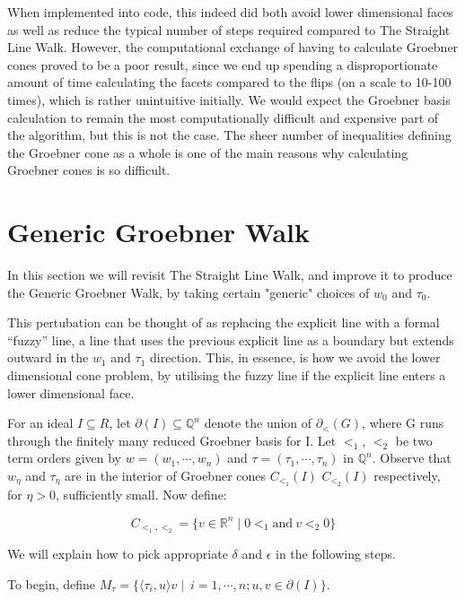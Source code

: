 \documentclass[12pt,a4paper]{report}
\begin{document}
When implemented into code, this indeed did both avoid lower dimensional faces as well as reduce the typical number of steps required compared to The Straight Line Walk. However, the computational exchange of having to calculate Groebner cones proved to be a poor result, since we end up spending a disproportionate amount of time calculating the facets compared to the flips (on a scale to 10-100 times), which is rather unintuitive initially. We would expect the Groebner basis calculation to remain the most computationally difficult and expensive part of the algorithm, but this is not the case. The sheer number of inequalities defining the Groebner cone as a whole is one of the main reasons why calculating Groebner cones is so difficult.

\section{Generic Groebner Walk}
In this section we will revisit The Straight Line Walk, and improve it to produce the Generic Groebner Walk, by taking certain "generic" choices of $w_{0}$ and $\tau_{0}$.


This pertubation can be thought of as replacing the explicit line with a formal ``fuzzy'' line, a line that uses the previous explicit line as a boundary but extends outward in the $w_{1}$ and $\tau_{1}$ direction. This, in essence, is how we avoid the lower dimensional cone problem, by utilising the fuzzy line if the explicit line enters a lower dimensional face.

For an ideal $I \subseteq R$, let $\partial (I) \subseteq \mathbb Q^n$ denote the union of $\partial_{<} (G)$, where G runs through the finitely many reduced Groebner basis for I. Let $<_{1}$, $<_{2}$ be two term orders given by $w = (w_{1}, \cdots, w_{n})$ and $\tau = (\tau_{1}, \cdots, \tau_{n})$ in $\mathbb Q^n$. Observe that $w_{\eta}$ and $\tau_{\eta}$ are in the interior of Groebner cones $C_{{<}_{1}} (I)$ $C_{{<}_{2}} (I)$ respectively, for $\eta > 0$, sufficiently small. Now define:

\begin{equation*}
    C_{<_{1}, <_{2}} = \{ v \in \mathbb R^{n} \mid 0 <_{1} \text{and} \: v <_{2} 0 \}
\end{equation*}

We will explain how to pick appropriate $\delta$ and $\epsilon$ in the following steps.

To begin, define $M_{\tau} = \{ \langle \tau_{i}, u \rangle v \mid \: i = 1, \cdots, n; u, v \in \partial (I) \}$.
\end{document}
